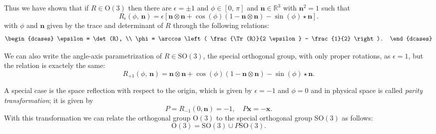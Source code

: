 Thus we have shown that if \(R \in \mathrm{O}(3)\) then there are \(\epsilon=\pm 1\) and \(\phi \in [0,\,\pi]\) and \(\mathbf{n} \in \mathbb{R}^3\) with \(\mathbf{n}^2 = 1\) such that
\[
    R_{\epsilon}(\phi,\,\mathbf{n}) = \epsilon \left[ \mathbf{n} \otimes \mathbf{n} + \cos(\phi) (1 - \mathbf{n} \otimes \mathbf{n}) - \sin(\phi) \star \mathbf{n} \right].
\]
with \(\phi\)  and \(\mathbf{n}\) given by the trace and determinant of \(R\) through the following relations:
\[
    \begin{dcases}
        \epsilon = \det(R), \\
        \phi = \arccos\left( \frac{\Tr(R)}{2 \epsilon} - \frac{1}{2} \right).
    \end{dcases}
\]

We can also write the angle-axis parametrization of \(R \in \mathrm{SO}(3)\), the special orthogonal group, with only proper rotations, as \(\epsilon = 1\), but the relation is exactely the same:
\[
    R_{+1}(\phi,\,\mathbf{n}) = \mathbf{n} \otimes \mathbf{n} + \cos(\phi) (1 - \mathbf{n} \otimes \mathbf{n}) - \sin(\phi) \star \mathbf{n}.
\]

A special case is the space reflection with respect to the origin, which is given by \(\epsilon = -1\) and \(\phi = 0\) and in physical space is called \textit{parity transformation}; it is given by
\[
    P = R_{-1}(0, \mathbf{n}) = -1, \quad P \mathbf{x} = -\mathbf{x}.
\]
With this transformation we can relate the orthogonal group \(\mathrm{O}(3)\) to the special orthogonal group \(\mathrm{SO}(3)\) as follows:
\[
    \mathrm{O}(3) = \mathrm{SO}(3) \cup P \mathrm{SO}(3).
\]

